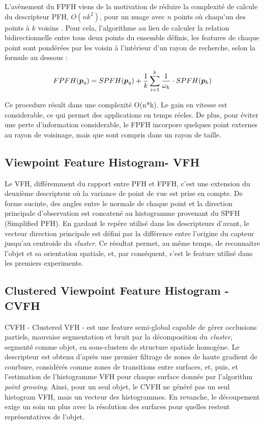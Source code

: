 L'avènement du FPFH viens de la motivation de réduire la complexité de
calcule du descripteur PFH, $ O(nk^2) $, pour un nuage avec $n$ points 
où chaqu'un des points à $k$ voisins . Pour cela, l'algorithme au
lieu de calculer la relation bidirectionnelle entre tous deux points 
du ensemble définis, les features de chaque point sont pondérées 
par les voisin à l'intérieur d'un rayon de recherche, selon la formule
au dessous :
 
$$FPFH(\boldsymbol{p}_q) = SPFH(\boldsymbol{p}_q) + {1 \over k}
\sum_{i=1}^k {{1 \over \omega_k} \cdot SPFH(\boldsymbol{p}_k)}$$

Ce procedure résult dans une complexité O(n*k). Le gain en vitesse est considerable,
ce qui permet des applications en temps réeles. De plus, pour éviter une perte d'information considerable, le FPFH
incorpore quelques point externes au rayon de voisinage, mais que sont compris dans un rayon de taille.

\subsection{Viewpoint Feature Histogram- VFH}

Le VFH, différemment du rapport entre PFH et FPFH, c'est une extension
du deuxième descripteur où la variance de point de vue est prise en
compte. De forme sucinte, des angles entre le normale de chaque point
et la direction principale d'observation est concatené au histogramme
provenant du SPFH (Simplified PFH). En gardant le repère utilisé dans
les descripteurs d'avant, le vecteur direction principale est défini
par la différence entre l'origine du capteur jusqu'au centroide du
\textit{cluster}. Ce résultat permet, au même temps, de reconnaitre
l'objet et sa orientation spatiale, et, par conséquent, c'est le
feature utilisé dans les premiers experiments.

\subsection{Clustered Viewpoint Feature Histogram - CVFH} CVFH -
Clustered VFH - est une feature semi-global capable de gérer
occlusions partiels, mauvaise segmentation et bruit par la
décomposition du \textit{cluster}, segmenté comme objet, en sous-clusters de
structure spatiale homogène. Le descripteur est obtenu d'après une premier
filtrage de zones de haute gradient de courbure, considérés comme zones de
transitions entre surfaces, et, puis, et l'estimation de l'histogramme VFH pour chaque surface 
donnée par l'algorithm \textit{point growing}. Ainsi, pour un seul objet, le CVFH ne
généré pas un seul histogram VFH, mais un vecteur des histogrammes.
 En revanche, le découpement exige un soin un plus avec la résolution des surfaces pour
quelles restent représentatives de l'objet.


